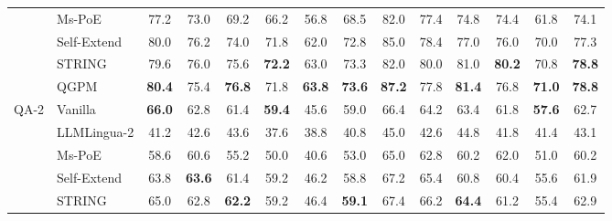 \documentclass[11pt]{article}
\begin{document}
\begin{table}[t]
\begin{tabular*}{\textwidth}{@{\extracolsep{\fill}} ll cccccc @{\hspace{10pt}} cccccc @{}}
 & Ms-PoE & \phantom{0}77.2 & \phantom{0}73.0 & \phantom{0}69.2 & \phantom{0}66.2 & \phantom{0}56.8 & \phantom{0}68.5 & \phantom{0}82.0 & \phantom{0}77.4 & \phantom{0}74.8 & \phantom{0}74.4 & \phantom{0}61.8 & \phantom{0}74.1 \\
 & Self-Extend & \phantom{0}80.0 & \phantom{0}76.2 & \phantom{0}74.0 & \phantom{0}71.8 & \phantom{0}62.0 & \phantom{0}72.8 & \phantom{0}85.0 & \phantom{0}78.4 & \phantom{0}77.0 & \phantom{0}76.0 & \phantom{0}70.0 & \phantom{0}77.3 \\
 & STRING & \phantom{0}79.6 & \phantom{0}76.0 & \phantom{0}75.6 & \textbf{\phantom{0}72.2} & \phantom{0}63.0 & \phantom{0}73.3 & \phantom{0}82.0 & \phantom{0}80.0 & \phantom{0}81.0 & \textbf{\phantom{0}80.2} & \phantom{0}70.8 & \textbf{\phantom{0}78.8} \\
 & QGPM & \textbf{\phantom{0}80.4} & \phantom{0}75.4 & \textbf{\phantom{0}76.8} & \phantom{0}71.8 & \textbf{\phantom{0}63.8} & \textbf{\phantom{0}73.6} & \textbf{\phantom{0}87.2} & \phantom{0}77.8 & \textbf{\phantom{0}81.4} & \phantom{0}76.8 & \textbf{\phantom{0}71.0} & \textbf{\phantom{0}78.8} \\
\midrule
\multirow{6}{*}{QA-2} & Vanilla & \textbf{\phantom{0}66.0} & \phantom{0}62.8 & \phantom{0}61.4 & \textbf{\phantom{0}59.4} & \phantom{0}45.6 & \phantom{0}59.0 & \phantom{0}66.4 & \phantom{0}64.2 & \phantom{0}63.4 & \phantom{0}61.8 & \textbf{\phantom{0}57.6} & \phantom{0}62.7 \\
 & LLMLingua-2 & \phantom{0}41.2 & \phantom{0}42.6 & \phantom{0}43.6 & \phantom{0}37.6 & \phantom{0}38.8 & \phantom{0}40.8 & \phantom{0}45.0 & \phantom{0}42.6 & \phantom{0}44.8 & \phantom{0}41.8 & \phantom{0}41.4 & \phantom{0}43.1 \\
 & Ms-PoE & \phantom{0}58.6 & \phantom{0}60.6 & \phantom{0}55.2 & \phantom{0}50.0 & \phantom{0}40.6 & \phantom{0}53.0 & \phantom{0}65.0 & \phantom{0}62.8 & \phantom{0}60.2 & \phantom{0}62.0 & \phantom{0}51.0 & \phantom{0}60.2 \\
 & Self-Extend & \phantom{0}63.8 & \textbf{\phantom{0}63.6} & \phantom{0}61.4 & \phantom{0}59.2 & \phantom{0}46.2 & \phantom{0}58.8 & \phantom{0}67.2 & \phantom{0}65.4 & \phantom{0}60.8 & \phantom{0}60.4 & \phantom{0}55.6 & \phantom{0}61.9 \\
 & STRING & \phantom{0}65.0 & \phantom{0}62.8 & \textbf{\phantom{0}62.2} & \phantom{0}59.2 & \phantom{0}46.4 & \textbf{\phantom{0}59.1} & \phantom{0}67.4 & \phantom{0}66.2 & \textbf{\phantom{0}64.4} & \phantom{0}61.2 & \phantom{0}55.4 & \phantom{0}62.9 \\

\end{tabular*}
\end{table}
\end{document}
